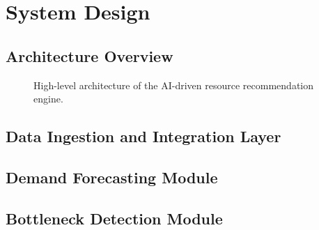 \chapter{System Design}
\label{chap:system_design}

\section{Architecture Overview}
\label{sec:architecture}


\begin{figure}[htbp]
  \centering
  \caption{High-level architecture of the AI-driven resource recommendation engine.}
  \label{fig:architecture}
\end{figure}

\section{Data Ingestion and Integration Layer}
\label{sec:data_layer}


\section{Demand Forecasting Module}
\label{sec:forecasting_module}


\section{Bottleneck Detection Module}
\label{sec:bottleneck_module}


